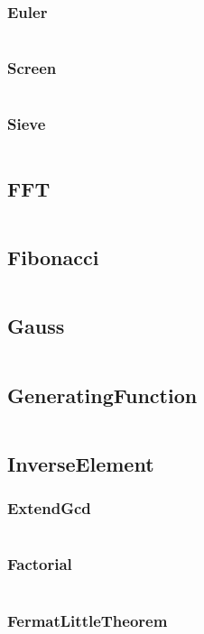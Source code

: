 \documentclass[a4paper,11pt]{article}
\begin{document}
\subsubsection{Euler}
\inputminted[breaklines]{c++}{02++Math/+Euler/+Euler.cpp}
\subsubsection{Screen}
\inputminted[breaklines]{c++}{02++Math/+Euler/+Screen.cpp}
\subsubsection{Sieve}
\inputminted[breaklines]{c++}{02++Math/+Euler/+Sieve.cpp}

\subsection{FFT}
\inputminted[breaklines]{c++}{02++Math/+FFT.cpp}
\subsection{Fibonacci}
\inputminted[breaklines]{c++}{02++Math/+Fibonacci.cpp}
\subsection{Gauss}
\inputminted[breaklines]{c++}{02++Math/+Gauss.cpp}
\subsection{GeneratingFunction}
\inputminted[breaklines]{c++}{02++Math/+GeneratingFunction.cpp}
\subsection{InverseElement}
\subsubsection{ExtendGcd}
\inputminted[breaklines]{c++}{02++Math/+InverseElement/+ExtendGcd.cpp}
\subsubsection{Factorial}
\inputminted[breaklines]{c++}{02++Math/+InverseElement/+Factorial.cpp}
\subsubsection{FermatLittleTheorem}
\inputminted[breaklines]{c++}{02++Math/+InverseElement/+FermatLittleTheorem.cpp}
\end{document}
